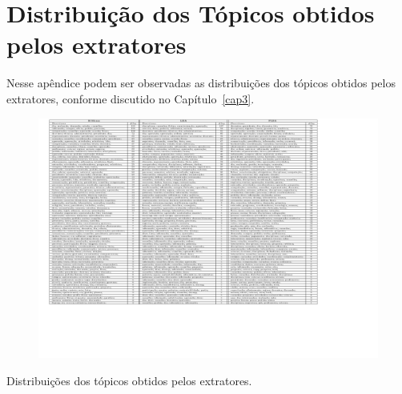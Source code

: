 \chapter{ Distribuição dos Tópicos obtidos pelos extratores}\label{apendice3}




Nesse apêndice podem ser observadas as distribuições dos tópicos obtidos pelos extratores, conforme discutido no Capítulo~\ref{cap3}.



\begin{landscape}%







\begin{figure}[h]
\center
	\includegraphics[trim={ 40 600 200 0 }, page=1,width=1.2\textwidth]{anexos/tabelas/distribuicao-topicos/distribuicao-topicos.pdf}
\end{figure}





\begin{table}[b]
	\caption{Distribuições dos tópicos obtidos pelos extratores.}
\end{table}




\end{landscape}

